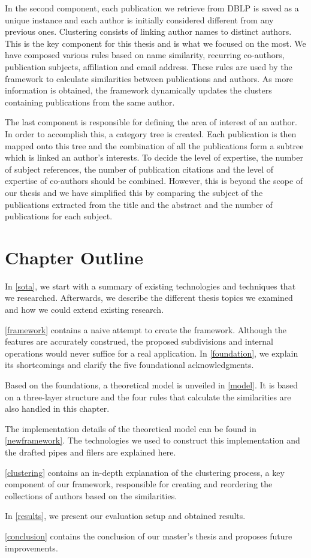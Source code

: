 In the second component, each publication we retrieve from DBLP is saved as a unique instance and each author is initially considered different from any previous ones. Clustering consists of linking author names to distinct authors. This is the key component for this thesis and is what we focused on the most. We have composed various rules based on name similarity, recurring co-authors, publication subjects, affiliation and email address. These rules are used by the framework to calculate similarities between publications and authors. As more information is obtained, the framework dynamically updates the clusters containing publications from the same author.

The last component is responsible for defining the area of interest of an author. In order to accomplish this, a category tree is created. Each publication is then mapped onto this tree and the combination of all the publications form a subtree which is linked an author's interests. To decide the level of expertise, the number of subject references, the number of publication citations and the level of expertise of co-authors should be combined. However, this is beyond the scope of our thesis and we have simplified this by comparing the subject of the publications extracted from the title and the abstract and the number of publications for each subject.

\section{Chapter Outline}

In \autoref{sota}, we start with a summary of existing technologies and techniques that we researched. Afterwards, we describe the different thesis topics we examined and how we could extend existing research. 

\autoref{framework} contains a naive attempt to create the framework. Although the features are accurately construed, the proposed subdivisions and internal operations would never suffice for a real application. In \autoref{foundation}, we explain its shortcomings and clarify the five foundational acknowledgments.

Based on the foundations, a theoretical model is unveiled in \autoref{model}. It is based on a three-layer structure and the four rules that calculate the similarities are also handled in this chapter.

The implementation details of the theoretical model can be found in \autoref{newframework}. The technologies we used to construct this implementation and the drafted pipes and filers are explained here.

\autoref{clustering} contains an in-depth explanation of the clustering process, a key component of our framework, responsible for creating and reordering the collections of authors based on the similarities.

In \autoref{results}, we present our evaluation setup and obtained results.

\autoref{conclusion} contains the conclusion of our master's thesis and proposes future improvements.